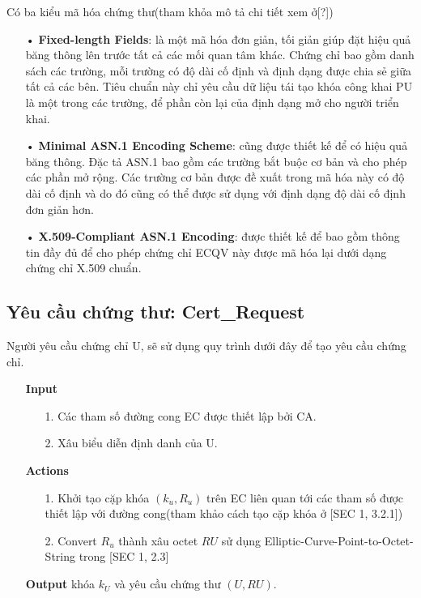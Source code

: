 \documentclass[a4paper,12pt]{report}
\begin{document}
Có ba kiểu mã hóa chứng thư(tham khỏa mô tả chi tiết xem ở[?])
\begin{itemize}
\item[•] \textbf{Fixed-length Fields}: là một mã hóa đơn giản, tối giản giúp đặt hiệu quả băng thông lên trước tất cả các mối quan tâm khác. Chứng chỉ bao gồm danh sách các trường, mỗi trường có độ dài cố định và định dạng được chia sẻ giữa tất cả các bên. Tiêu chuẩn này chỉ yêu cầu dữ liệu tái tạo khóa công khai PU là một trong các trường, để phần còn lại của định dạng mở cho người triển khai.
\item[•] \textbf{Minimal ASN.1 Encoding Scheme}: cũng được thiết kế để có hiệu quả băng thông. Đặc tả ASN.1 bao gồm các trường bắt buộc cơ bản và cho phép các phần mở rộng. Các trường cơ bản được đề xuất trong mã hóa này có độ dài cố định và do đó cũng có thể được sử dụng với định dạng độ dài cố định đơn giản hơn.
\item[•] \textbf{X.509-Compliant ASN.1 Encoding}: được thiết kế để bao gồm thông tin đầy đủ để cho phép chứng chỉ ECQV này được mã hóa lại dưới dạng chứng chỉ X.509 chuẩn.
\end{itemize}
\subsection{Yêu cầu chứng thư: Cert\_Request}
Người yêu cầu chứng chỉ U, sẽ sử dụng quy trình dưới đây để tạo yêu cầu chứng chỉ.
\begin{itemize}
\item[] \textbf{Input}
\begin{itemize}
\item[1. ] Các tham số đường cong EC được thiết lập bởi CA.
\item[2. ] Xâu biểu diễn định danh của U.
\end{itemize}
\item[] \textbf{Actions}
\begin{itemize}
\item[1. ] Khởi tạo cặp khóa $(k_u, R_u)$  trên EC liên quan tới các tham số được thiết lập với đường cong(tham khảo cách tạo cặp khóa ở [SEC 1, 3.2.1])
\item[2. ] Convert $R_u$ thành xâu octet $RU$ sử dụng  Elliptic-Curve-Point-to-Octet-String trong [SEC 1, 2.3]
\end{itemize}
\item[] \textbf{Output} khóa $k_U$ và yêu cầu chứng thư $(U, RU)$.
\end{itemize}
\end{document}
